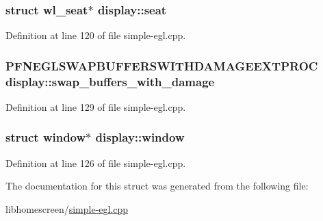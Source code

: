 \subsubsection[{\texorpdfstring{seat}{seat}}]{\setlength{\rightskip}{0pt plus 5cm}struct wl\+\_\+seat$\ast$ display\+::seat}\hypertarget{structdisplay_a9dd8fd9967beb6b3767bd93011373bb8}{}\label{structdisplay_a9dd8fd9967beb6b3767bd93011373bb8}


Definition at line 120 of file simple-\/egl.\+cpp.

\subsubsection[{\texorpdfstring{swap\+\_\+buffers\+\_\+with\+\_\+damage}{swap_buffers_with_damage}}]{\setlength{\rightskip}{0pt plus 5cm}P\+F\+N\+E\+G\+L\+S\+W\+A\+P\+B\+U\+F\+F\+E\+R\+S\+W\+I\+T\+H\+D\+A\+M\+A\+G\+E\+E\+X\+T\+P\+R\+OC display\+::swap\+\_\+buffers\+\_\+with\+\_\+damage}\hypertarget{structdisplay_a48c46c118e4765ef06596f6341c8f23f}{}\label{structdisplay_a48c46c118e4765ef06596f6341c8f23f}


Definition at line 129 of file simple-\/egl.\+cpp.

\subsubsection[{\texorpdfstring{window}{window}}]{\setlength{\rightskip}{0pt plus 5cm}struct {\bf window}$\ast$ display\+::window}\hypertarget{structdisplay_a9974d560bec291487ae2440f897ffc58}{}\label{structdisplay_a9974d560bec291487ae2440f897ffc58}


Definition at line 126 of file simple-\/egl.\+cpp.



The documentation for this struct was generated from the following file\+:\begin{DoxyCompactItemize}
\item 
libhomescreen/\hyperlink{simple-egl_8cpp}{simple-\/egl.\+cpp}\end{DoxyCompactItemize}
